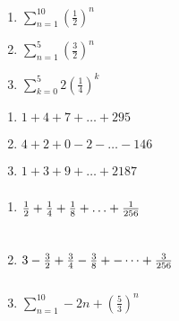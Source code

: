 \documentclass{ximera}
\begin{document}
\begin{multicols}{3}
\begin{enumerate}
\setcounter{enumi}{\value{HW}}

\item $\displaystyle \sum_{n = 1}^{10} \left(\frac{1}{2}\right)^{n}$

\item $\displaystyle \sum_{n = 1}^{5} \left(\frac{3}{2}\right)^{n}$ 

\item $\displaystyle \sum_{k = 0}^{5} 2\left(\frac{1}{4}\right)^{k}$ 

\setcounter{HW}{\value{enumi}}
\end{enumerate}
\end{multicols}

\begin{multicols}{3}
\begin{enumerate}
\setcounter{enumi}{\value{HW}}

\item  $1+4+7+ \ldots +295$  

\item  $4+2+0-2- \ldots - 146$  

\item $1+3+9+ \ldots + 2187$ 
\setcounter{HW}{\value{enumi}}
\end{enumerate}
\end{multicols}

\begin{multicols}{3}
\begin{enumerate}
\setcounter{enumi}{\value{HW}}

\item  $\frac{1}{2} + \frac{1}{4} + \frac{1}{8} + \ldots + \frac{1}{256}\vphantom{\displaystyle \sum_{n = 1}^{10} -2n + \left(\frac{5}{3}\right)^{n}}$ 

\item $3 - \frac{3}{2} + \frac{3}{4} - \frac{3}{8}+- \dots +\frac{3}{256} \vphantom{\displaystyle \sum_{n = 1}^{10} -2n + \left(\frac{5}{3}\right)^{n}}$



\item $\displaystyle \sum_{n = 1}^{10} -2n + \left(\frac{5}{3}\right)^{n}$ \label{findsumformulalast}

\setcounter{HW}{\value{enumi}}
\end{enumerate}
\end{multicols}
\end{document}
